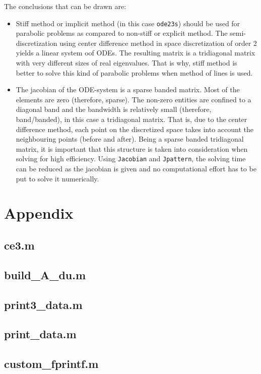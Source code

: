 \documentclass{article}
\begin{document}
The conclusions that can be drawn are:
\begin{itemize}
    \item Stiff method or implicit method (in this case \texttt{ode23s})
      should be used for parabolic problems as compared to non-stiff or
      explicit method. The semi-discretization using center difference method
      in space discretization of order 2 yields a linear system oof ODEs. The
      resulting matrix is a tridiagonal matrix with very different sizes of
      real eigenvalues. That is why, stiff method is better to solve this kind
      of parabolic problems when method of lines is used.
      
    \item The jacobian of the ODE-system is a sparse banded matrix. Most of
      the elements are zero (therefore, sparse). The non-zero entities are
      confined to a diagonal band and the bandwidth is relatively small
      (therefore, band/banded), in this case a tridiagonal matrix. That is,
      due to the center difference method, each point on the discretized space
      takes into account the neighbouring points (before and after). Being a
      sparse banded tridiagonal matrix, it is important that this structure is
      taken into consideration when solving for high efficiency. Using
      \texttt{Jacobian} and \texttt{Jpattern}, the solving time can be reduced
      as the jacobian is given and no computational effort has to be put to
      solve it numerically. 
\end{itemize}

\section{Appendix}

\subsection{ce3.m}

\subsection{build\_A\_du.m}

\subsection{print3\_data.m}

\subsection{print\_data.m}

\subsection{custom\_fprintf.m}

\end{document}
